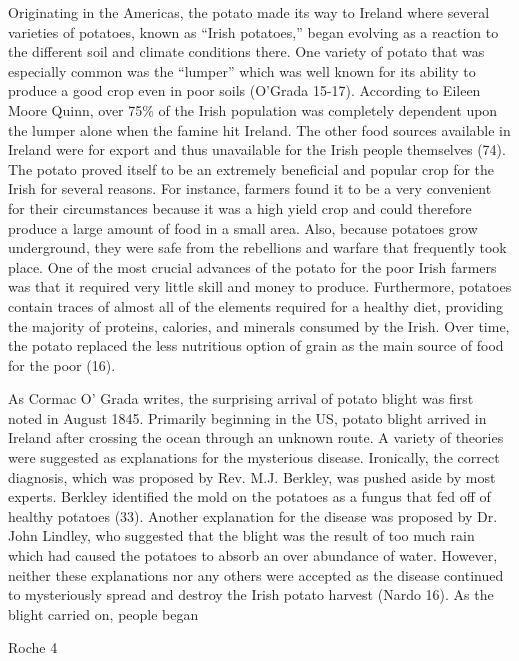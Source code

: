 \begin{Spacing}{1.5}
\hspace{.4in}Originating in the Americas, the potato made its way to Ireland where several varieties of potatoes, known as “Irish potatoes,” began evolving as a reaction to the different soil and climate conditions there. One variety of potato that was especially common was the “lumper” which was well known for its ability to produce a good crop even in poor soils (O'Grada 15-17). According to Eileen Moore Quinn, over 75\% of the Irish population was completely dependent upon the lumper alone when the famine hit Ireland. The other food sources available in Ireland were for export and thus unavailable for the Irish people themselves (74). The potato proved itself to be an extremely beneficial and popular crop for the Irish for several reasons. For instance, farmers found it to be a very convenient for their circumstances because it was a high yield crop and could therefore produce a large amount of food in a small area. Also, because potatoes grow underground, they were safe from the rebellions and warfare that frequently took place. One of the most crucial advances of the potato for the poor Irish farmers was that it required very little skill and money to produce. Furthermore, potatoes contain traces of almost all of the elements required for a healthy diet, providing the majority of proteins, calories, and minerals consumed by the Irish. Over time, the potato replaced the less nutritious option of grain as the main source of food for the poor (16).

\hspace{.4in}As Cormac O’ Grada writes, the surprising arrival of potato blight was first noted in August 1845. Primarily beginning in the US, potato blight arrived in Ireland after crossing the ocean through an unknown route. A variety of theories were suggested as explanations for the mysterious disease. Ironically, the correct diagnosis, which was proposed by Rev. M.J. Berkley, was pushed aside by most experts. Berkley identified the mold on the potatoes as a fungus that fed off of healthy potatoes (33). Another explanation for the disease was proposed by Dr. John Lindley, who suggested that the blight was the result of too much rain which had caused the potatoes to absorb an over abundance of water. However, neither these explanations nor any others were accepted as the disease continued to mysteriously spread and destroy the Irish potato harvest (Nardo 16).  As the blight carried on, people began 
\newpage
\thispagestyle{empty}
\begin{flushright}Roche 4\end{flushright}


\end{Spacing}
